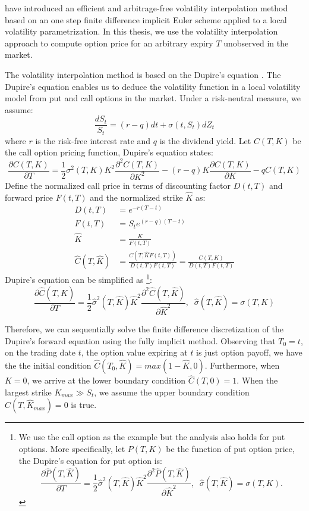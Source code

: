 \documentclass[letterpaper,12pt,titlepage,oneside,final]{book}
\numberwithin{equation}{section}
\theoremstyle{definition}
\begin{document}
\citet{andreasen2010volatility} have introduced an efficient and arbitrage-free volatility interpolation method based on an one step finite difference implicit Euler scheme applied to a local volatility parametrization. In this thesis, we use the volatility interpolation approach to compute option price for an arbitrary expiry $T$ unobserved in the market.




The volatility interpolation method is based on the Dupire's equation \cite{dupire1994pricing}.  The Dupire's equation enables us to deduce the volatility function in a local volatility
model from  put and call options in the market.
Under a risk-neutral measure, we assume:
\[
\frac{d S_t}{ S_t}= \left(r-q\right)dt +\sigma(t,S_t) dZ_t
\]
where $r$ is the risk-free interest rate and $q$ is the dividend yield.
Let $C(T,K)$ be the call option pricing function, Dupire's equation states:
\[
\frac{\partial C(T,K)}{\partial T}=\frac{1}{2} {\sigma}^2(T,K)K^2  \frac{\partial^2 C(T,K)}{ \partial K^2}-(r-q) K\frac{\partial C(T,K)}{\partial K}-qC(T,K)
\]
Define the normalized call price in terms of discounting factor $D(t,T)$ and forward price $F(t,T)$ and the normalized strike $\widehat{K}$ as:
\[
\begin{split}
D(t,T)&=e^{-r(T-t)}\\
F(t,T)&=S_te^{(r-q)(T-t)}\\
\widehat{K}&=\frac{K}{F(t,T)}\\
\widehat{C}(T,\widehat{K})&=\frac{C(T,\widehat{K} F(t,T))}{D(t,T)F(t,T)}=\frac{C(T,K)}{D(t,T)F(t,T)}
\end{split}
\]
Dupire's equation can be simplified as \cite{andreasen2010volatility}\footnote{
	We use the call option as the example but the analysis also holds for put options. More specifically, let $P(T,K)$	be the function of put option price, the Dupire's equation for put option is:
	\[
	\frac{\partial \widehat{P}(T,\widehat{K})}{\partial T}=\frac{1}{2} \widehat{\sigma}^2(T,\widehat{K}) \widehat{K}^2  \frac{\partial^2 \widehat{P}(T,\widehat{K})}{ \partial \widehat{K}^2},\;\; \widehat{\sigma}(T,\widehat{K})={\sigma}(T,K).
	\]
}:
\[
\frac{\partial \widehat{C}(T,\widehat{K})}{\partial T}=\frac{1}{2} \widehat{\sigma}^2(T,\widehat{K}) \widehat{K}^2  \frac{\partial^2 \widehat{C}(T,\widehat{K})}{ \partial \widehat{K}^2},\;\; \widehat{\sigma}(T,\widehat{K})={\sigma}(T,K)
\]

Therefore, we can sequentially solve the finite difference  discretization of the Dupire's forward equation using the fully implicit method.
Observing that $T_0=t$, on the trading date $t$, the option value expiring at $t$ is just option payoff, we have the the initial condition $\widehat{C}(T_0,\widehat{K})=max(1-\widehat{K},0)$.
Furthermore, when $K=0$, we arrive at the lower boundary condition $\widehat{C}(T,0)=1$. 
When the largest strike $K_{max}\gg S_t$, we assume the upper boundary condition $\widehat{C}(T,\widehat{K}_{max})=0$ is true. 
\end{document}
